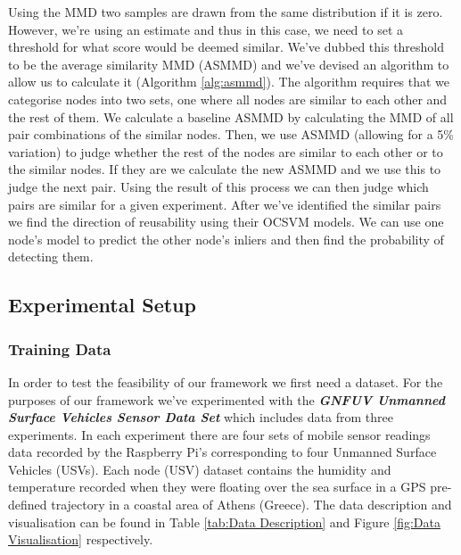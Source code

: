 \documentclass{mprop}
\begin{document}
Using the MMD two samples are drawn from the same distribution if it is zero. However, we're using an estimate and thus in this case, we need to set a threshold for what score would be deemed similar. We've dubbed this threshold to be the average similarity MMD (ASMMD) and we've devised an algorithm to allow us to calculate it (Algorithm \ref{alg:asmmd}). The algorithm requires that we categorise nodes into two sets, one where all nodes are similar to each other and the rest of them. We calculate a baseline ASMMD by calculating the MMD of all pair combinations of the similar nodes. Then, we use ASMMD (allowing for a 5\% variation) to judge whether the rest of the nodes are similar to each other or to the similar nodes. If they are we calculate the new ASMMD and we use this to judge the next pair. Using the result of this process we can then judge which pairs are similar for a given experiment. After we've identified the similar pairs we find the direction of reusability using their OCSVM models. We can use one node's model to predict the other node's inliers and then find the probability of detecting them. 

\subsection{Experimental Setup}

\subsubsection{Training Data}

In order to test the feasibility of our framework we first need a dataset. For the purposes of our framework we've experimented with the \textbf{\textit{GNFUV Unmanned Surface Vehicles Sensor Data Set}} \cite{Dataset} which includes data from three experiments. In each experiment there are four sets of mobile sensor readings data recorded by the Raspberry Pi's corresponding to four Unmanned Surface Vehicles (USVs). Each node (USV) dataset contains the humidity and temperature recorded when they were floating over the sea surface in a GPS pre-defined trajectory in a coastal area of Athens (Greece). The data description and visualisation can be found in Table \ref{tab:Data Description} and Figure \ref{fig:Data Visualisation} respectively.
\end{document}
